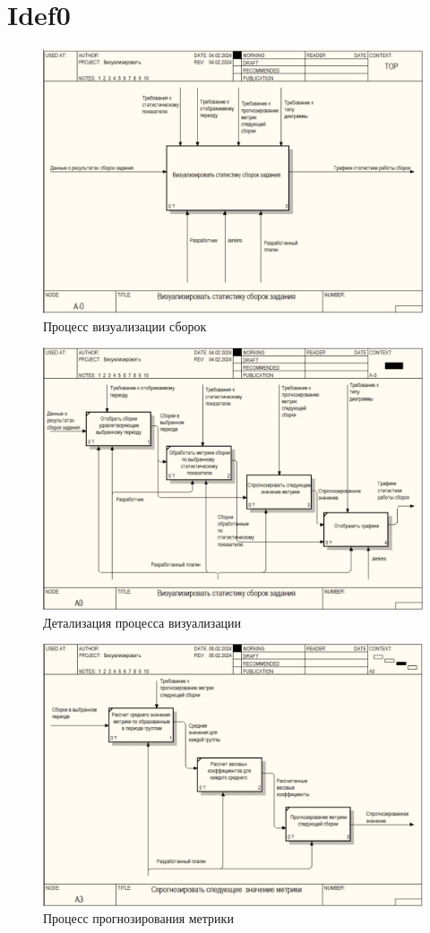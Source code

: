 \chapter{Idef0}\label{appendix-extra-examples}
\begin{figure}[ht!] 
	\center
	\includegraphics [scale=0.7] {my_folder/images//er1}
	\caption{Процесс визуализации сборок} 
	\label{fig:er1}  
\end{figure}

\begin{figure}[ht!] 
	\center
	\includegraphics [scale=0.7] {my_folder/images//er2}
	\caption{Детализация процесса визуализации} 
	\label{fig:er2}  
\end{figure}

\begin{figure}[ht!] 
	\center
	\includegraphics [scale=0.7] {my_folder/images//er3}
	\caption{Процесс прогнозирования метрики} 
	\label{fig:er3}  
\end{figure}

